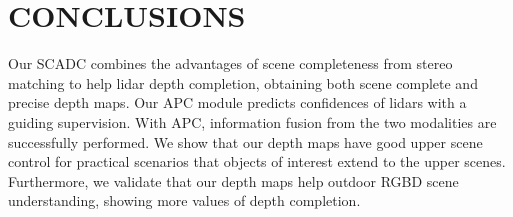 \documentclass{article}
\begin{document}
\vspace{-9pt}
\section{CONCLUSIONS}
\vspace{-8pt}
Our SCADC combines the advantages of scene completeness from stereo matching to help lidar depth completion, obtaining both scene complete and precise depth maps. Our APC module predicts confidences of lidars with a guiding supervision. With APC, information fusion from the two modalities are successfully performed. We show that our depth maps have good upper scene control for practical scenarios that objects of interest extend to the upper scenes. Furthermore, we validate that our depth maps help outdoor RGBD scene understanding, showing more values of depth completion.


{\footnotesize
}
\end{document}

